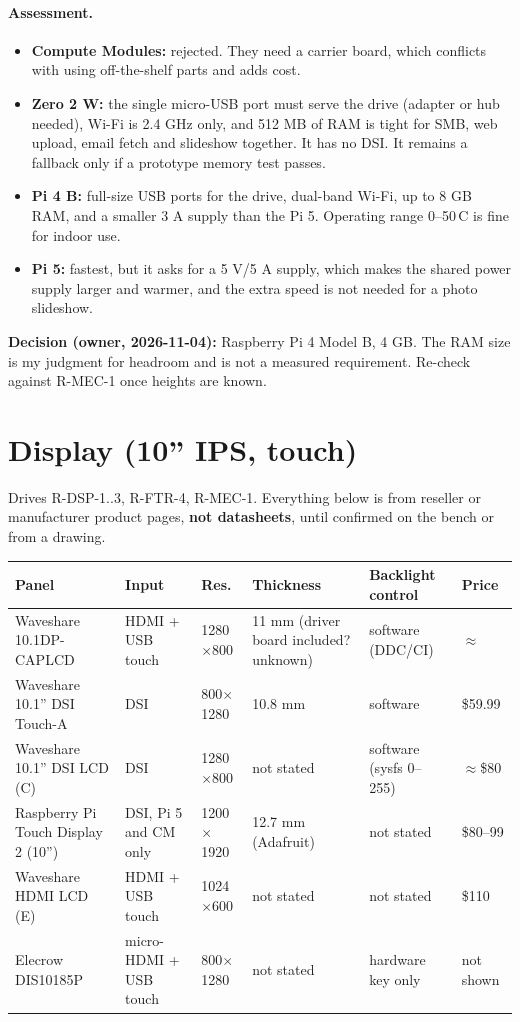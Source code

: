 \documentclass[11pt,a4paper]{article}
\begin{document}
\paragraph{Assessment.}
\begin{itemize}
  \item \textbf{Compute Modules:} rejected. They need a carrier board, which conflicts with using off-the-shelf parts and adds cost.
  \item \textbf{Zero 2 W:} the single micro-USB port must serve the drive (adapter or hub needed), Wi-Fi is 2.4 GHz only, and 512 MB of RAM is tight for SMB, web upload, email fetch and slideshow together. It has no DSI. It remains a fallback only if a prototype memory test passes.
  \item \textbf{Pi 4 B:} full-size USB ports for the drive, dual-band Wi-Fi, up to 8 GB RAM, and a smaller 3 A supply than the Pi 5. Operating range 0--50\,\textdegree C is fine for indoor use.
  \item \textbf{Pi 5:} fastest, but it asks for a 5 V/5 A supply, which makes the shared power supply larger and warmer, and the extra speed is not needed for a photo slideshow.
\end{itemize}

\textbf{Decision (owner, 2026-11-04):} Raspberry Pi 4 Model B, 4 GB. The RAM size is my judgment for headroom and is not a measured requirement. Re-check against R-MEC-1 once heights are known.

\section{Display (10'' IPS, touch)}
Drives R-DSP-1..3, R-FTR-4, R-MEC-1. Everything below is from reseller or manufacturer product pages, \textbf{not datasheets}, until confirmed on the bench or from a drawing.

\begin{longtable}{p{3.3cm} p{2.2cm} p{1.7cm} p{2.2cm} p{2.8cm} p{1.5cm}}
\toprule
\textbf{Panel} & \textbf{Input} & \textbf{Res.} & \textbf{Thickness} & \textbf{Backlight control} & \textbf{Price} \\
\midrule\endhead
Waveshare 10.1DP-CAPLCD & HDMI + USB touch & 1280$\times$800 & 11 mm (driver board included? unknown) & software (DDC/CI) & $\approx$\texteuro81 \\
Waveshare 10.1'' DSI Touch-A & DSI & 800$\times$1280 & 10.8 mm & software & \$59.99 \\
Waveshare 10.1'' DSI LCD (C) & DSI & 1280$\times$800 & not stated & software (sysfs 0--255) & $\approx$\$80 \\
Raspberry Pi Touch Display 2 (10'') & DSI, Pi 5 and CM only & 1200$\times$1920 & 12.7 mm (Adafruit) & not stated & \$80--99 \\
Waveshare HDMI LCD (E) & HDMI + USB touch & 1024$\times$600 & not stated & not stated & \$110 \\
Elecrow DIS10185P & micro-HDMI + USB touch & 800$\times$1280 & not stated & hardware key only & not shown \\
\bottomrule
\end{longtable}
\end{document}
